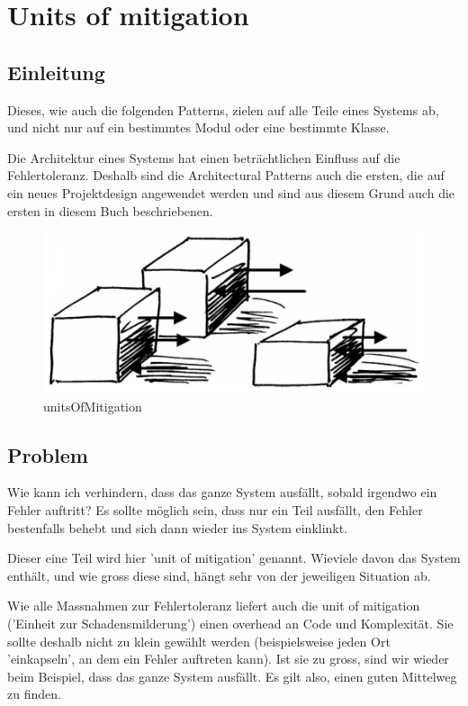 \section{Units of mitigation}


\subsection*{Einleitung}

Dieses, wie auch die folgenden Patterns, zielen auf alle Teile eines Systems ab, und nicht nur auf ein bestimmtes Modul oder eine bestimmte Klasse.

Die Architektur eines Systems hat einen beträchtlichen Einfluss auf die Fehlertoleranz. Deshalb sind die Architectural Patterns auch die ersten, die auf ein neues Projektdesign angewendet werden und sind aus diesem Grund auch die ersten in diesem Buch beschriebenen.

\begin{figure}[H]
	\centering
	\includegraphics[width=\textwidth]{content/faulttolerance/images/unitsOfMitigation.png}
	\caption{unitsOfMitigation}
\end{figure}


\subsection*{Problem}

Wie kann ich verhindern, dass das ganze System ausfällt, sobald irgendwo ein Fehler auftritt? Es sollte möglich sein, dass nur ein Teil ausfällt, den Fehler bestenfalls behebt und sich dann wieder ins System einklinkt.

Dieser eine Teil wird hier 'unit of mitigation' genannt. Wieviele davon das System enthält, und wie gross diese sind, hängt sehr von der jeweiligen Situation ab.

Wie alle Massnahmen zur Fehlertoleranz liefert auch die unit of mitigation ('Einheit zur Schadensmilderung') einen overhead an Code und Komplexität. Sie sollte deshalb nicht zu klein gewählt werden (beispielsweise jeden Ort 'einkapseln', an dem ein Fehler auftreten kann).
Ist sie zu gross, sind wir wieder beim Beispiel, dass das ganze System ausfällt. Es gilt also, einen guten Mittelweg zu finden.


